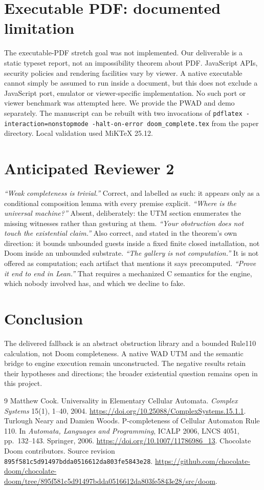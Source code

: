 \documentclass[11pt]{article}
\begin{document}
\section{Executable PDF: documented limitation}
The executable-PDF stretch goal was not implemented. Our deliverable is a
static typeset report, not an impossibility theorem about PDF. JavaScript APIs,
security policies and rendering facilities vary by viewer. A native executable
cannot simply be assumed to run inside a document, but this does not exclude a
JavaScript port, emulator or viewer-specific implementation. No such port or
viewer benchmark was attempted here. We provide the PWAD and demo separately.
The manuscript can be rebuilt with two invocations of
\texttt{pdflatex -interaction=nonstopmode -halt-on-error doom\_complete.tex}
from the paper directory. Local validation used MiKTeX 25.12.

\section*{Anticipated Reviewer 2}
\emph{``Weak completeness is trivial.''} Correct, and labelled as such: it
appears only as a conditional composition lemma with every premise explicit.
\emph{``Where is the universal machine?''} Absent, deliberately: the UTM
section enumerates the missing witnesses rather than gesturing at them.
\emph{``Your obstruction does not touch the existential claim.''} Also correct,
and stated in the theorem's own direction: it bounds unbounded guests inside a
fixed finite closed installation, not Doom inside an unbounded substrate.
\emph{``The gallery is not computation.''} It is not offered as computation;
each artifact that mentions it says precomputed. \emph{``Prove it end to end in
Lean.''} That requires a mechanized C semantics for the engine, which nobody
involved has, and which we decline to fake.

\section{Conclusion}
The delivered fallback is an abstract obstruction library and a bounded
Rule110 calculation, not Doom completeness. A native WAD UTM and the semantic
bridge to engine execution remain unconstructed. The negative results retain
their hypotheses and directions; the broader existential question remains open
in this project.

\begin{thebibliography}{9}
Matthew Cook. Universality in Elementary Cellular Automata.
\emph{Complex Systems} 15(1), 1--40, 2004.
\url{https://doi.org/10.25088/ComplexSystems.15.1.1}.
Turlough Neary and Damien Woods.
P-completeness of Cellular Automaton Rule 110.
In \emph{Automata, Languages and Programming}, ICALP 2006,
LNCS 4051, pp.~132--143. Springer, 2006.
\url{https://doi.org/10.1007/11786986_13}.
Chocolate Doom contributors. Source revision
\texttt{895f581c5d91497bdda0516612da803fe5843e28}.
\url{https://github.com/chocolate-doom/chocolate-doom/tree/895f581c5d91497bdda0516612da803fe5843e28/src/doom}.
\end{thebibliography}
\end{document}
